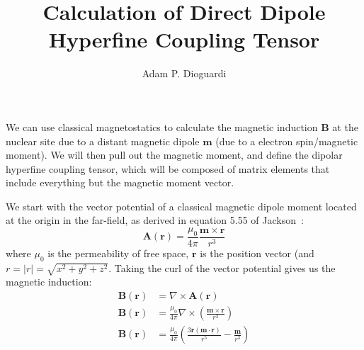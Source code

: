 \documentclass[12pt]{article}
\title{Calculation of Direct Dipole Hyperfine Coupling Tensor}
\author{Adam P. Dioguardi}
\begin{document}
\maketitle

We can use classical magnetostatics to calculate the magnetic induction $\mathbf{B}$ at the nuclear site due to a distant magnetic dipole $\mathbf{m}$ (due to a electron spin/magnetic moment). We will then pull out the magnetic moment, and define the dipolar hyperfine coupling tensor, which will be composed of matrix elements that include everything but the magnetic moment vector. 

We start with the vector potential of a classical magnetic dipole moment located at the origin in the far-field, as derived in equation 5.55 of Jackson~\cite{Jackson_1998_classical_ellectrodynamics_3rd}:
\begin{equation}
\label{eqn:dipole_vector_potential}
\mathbf{A}(\mathbf{r}) = \frac{\mu_0}{4\pi}\frac{\mathbf{m}\times\mathbf{r}}{r^3}
\end{equation}
where $\mu_0$ is the permeability of free space, $\mathbf{r}$ is the position vector (and $r = |r| = \sqrt{x^2 + y^2 + z^2}$. Taking the curl of the vector potential gives us the magnetic induction:
\begin{align}
\label{eqn:magnetic_induction_from_vector_potential}
\mathbf{B}(\mathbf{r}) &= \nabla \times \mathbf{A}(\mathbf{r})\\
\label{eqn:magnetic_induction_from_vector_potential_dipole}
\mathbf{B}(\mathbf{r}) &= \frac{\mu_0}{4\pi} \nabla \times \left( \frac{\mathbf{m}\times\mathbf{r}}{r^3} \right)\\
\label{eqn:magnetic_induction_of_dipole}
\mathbf{B}(\mathbf{r}) &= \frac{\mu_0}{4\pi} \left( \frac{3\mathbf{r}(\mathbf{m} \cdot \mathbf{r})}{r^5} - \frac{\mathbf{m}}{r^3} \right)
\end{align}
\end{document}
